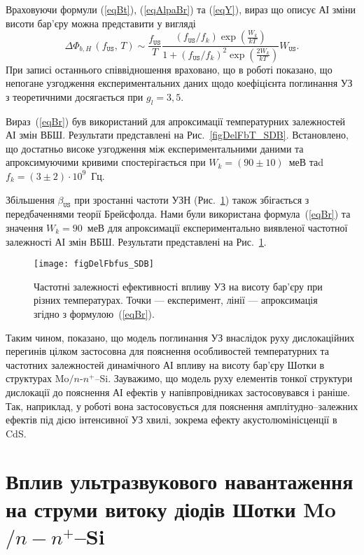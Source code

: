 \documentclass[a4paper,14pt,oneside,openany]{memoir}
\begin{document}
Враховуючи формули (\ref{eqBt}), (\ref{eqAlpaBr}) та (\ref{eqY}),
вираз що описує АІ зміни висоти бар'єру можна представити у вигляді
\begin{equation}
\label{eqBr}
\Delta\Phi_{b,H}\,(f_\mathtt{US},\,T)\sim\frac{f_\mathtt{US}}{T}\frac{(f_\mathtt{US}/{f_k})\exp\left(\frac{W_k}{kT}\right)}
{1+(f_\mathtt{US}/{f_k})^2\exp\left(\frac{2W_k}{kT}\right)}W_\mathtt{US}.
\end{equation}
При записі останнього співвідношення враховано, що
в роботі \cite{Olikh:UPJ2014} показано, що непогане узгодження експериментальних даних щодо коефіцієнта поглинання УЗ з теоретичними
досягається при $g_l=3,5$.



Вираз~(\ref{eqBr}) був використаний для апроксимації температурних залежностей АІ змін ВБШ.
Результати представлені на Рис.~\ref{figDelFbT_SDB}.
Встановлено, що достатньо високе узгодження між експериментальними даними та апроксимуючими кривими спостерігається
при  $W_k=(90\pm10)$~меВ таd $f_k=(3\pm2)\cdot10^9$~Гц.

Збільшення $\beta_\mathtt{US}$ при зростанні частоти УЗН (Рис.~\ref{figDelFbfus_SDB}) також збігається
з передбаченнями теорії Брейсфолда.
Нами були використана формула~(\ref{eqBr}) та значення $W_k=90$~меВ для апроксимації експериментально виявленої частотної залежності АІ змін ВБШ.
Результати представлені на Рис.~\ref{figDelFbfus_SDB}.


\begin{figure}
\center
\texttt{[image: figDelFbfus\_SDB]}
\caption{\label{figDelFbfus_SDB}
Частотні залежності ефективності впливу УЗ на висоту бар'єру при різних температурах.
Точки --- експеримент,
лінії --- апроксимація згідно з формулою~(\ref{eqBr}).
}%
\end{figure}


Таким чином, показано, що модель поглинання УЗ внаслідок руху дислокаційних перегинів цілком застосовна
для пояснення особливостей температурних та частотних залежностей динамічного АІ впливу на висоту бар'єру Шотки в структурах Mo$/n$-$n^+$--Si.
Зауважимо, що модель руху елементів тонкої структури дислокації до
пояснення АІ ефектів у напівпровідниках застосовувався і раніше.
Так, наприклад, у роботі \cite{Loktev} вона застосовується для пояснення амплітудно--залежних ефектів
під дією інтенсивної УЗ хвилі, зокрема ефекту акустолюмінісценції в CdS.


\section{Вплив ультразвукового навантаження на струми витоку діодів Шотки Mo$/n-n^+$--Si\label{SSDB:Rev}}
\end{document}
